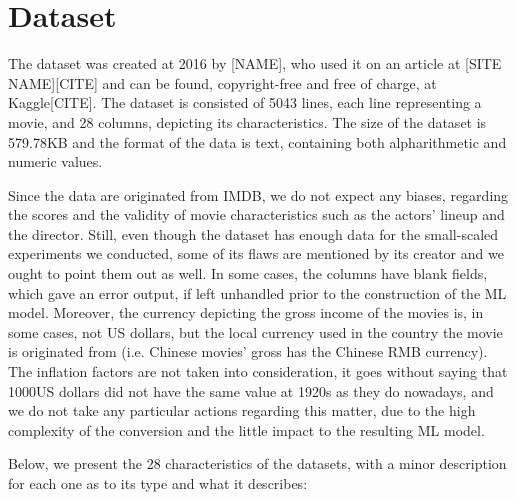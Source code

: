\documentclass[letterpaper,twocolumn,10pt]{article}
\begin{document}
\section{Dataset}

\par The dataset was created at 2016 by [NAME], who used it on an article at [SITE NAME][CITE] and can be found, copyright-free and free of charge, at Kaggle[CITE]. The dataset is consisted of 5043 lines, each line representing a movie, and 28 columns, depicting its characteristics. The size of the dataset is 579.78KB and the format of the data is text, containing both alpharithmetic and numeric values.\par Since the data are originated from IMDB, we do not expect any biases, regarding the scores and the validity of movie characteristics such as the actors' lineup and the director. Still, even though the dataset has enough data for the small-scaled experiments we conducted, some of its flaws are mentioned by its creator and we ought to point them out as well. In some cases, the columns have blank fields, which gave an error output, if left unhandled prior to the construction of the ML model. Moreover, the currency depicting the gross income of the movies is, in some cases, not US dollars, but the local currency used in the country the movie is originated from (i.e. Chinese movies' gross has the Chinese RMB currency). The inflation factors are not taken into consideration, it goes without saying that 1000US dollars did not have the same value at 1920s as they do nowadays, and we do not take any particular actions regarding this matter, due to the high complexity of the conversion and the little impact to the resulting ML model. \par Below, we present the 28 characteristics of the datasets, with a minor description for each one as to its type and what it describes:
\end{document}
